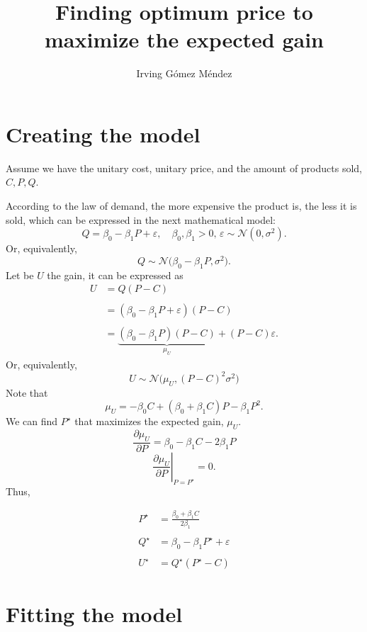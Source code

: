 \documentclass[11pt]{article}
\def\Normal{\mathcal{N}}
\begin{document}
\title{Finding optimum price to maximize the expected gain}
\author{Irving Gómez Méndez}
\date{}
\maketitle

\section{Creating the model}

Assume we have the unitary cost, unitary price, and the amount of products sold, $C,P,Q$.

According to the law of demand, the more expensive the product is, the less it is sold, which can be expressed in the next mathematical model:
\[Q=\beta_0-\beta_1 P+\varepsilon,\quad \beta_0,\beta_1>0,\,\varepsilon\sim\Normal(0,\sigma^2).\]
Or, equivalently,
\[Q\sim\Normal\Big(\beta_0-\beta_1 P, \sigma^2\Big).\]
Let be $U$ the gain, it can be expressed as
\begin{align*}
U &= Q(P-C) \\\\
&= (\beta_0-\beta_1 P+\varepsilon)(P-C) \\\\
& = \underbrace{(\beta_0-\beta_1 P)(P-C)}_{\mu_U}+(P-C)\varepsilon.
\end{align*}
Or, equivalently,
\[U\sim\Normal\Big(\mu_U,(P-C)^2\sigma^2\Big)\]
Note that
\[\mu_U=-\beta_0C+(\beta_0+\beta_1C)P-\beta_1P^2.\]
We can find $P^\star$ that maximizes the expected gain, $\mu_U$.
\[\frac{\partial \mu_U}{\partial P}=\beta_0-\beta_1C-2\beta_1 P\]
\[\left.\frac{\partial \mu_U}{\partial P}\right|_{P=P^\star}=0.\]
Thus,
\begin{IrvingBox}
\vspace{-0.5cm}
\begin{align*}
P^\star &= \frac{\beta_0+\beta_1C}{2\beta_1} \\\\
Q^\star &= \beta_0-\beta_1P^\star+\varepsilon \\\\
U^\star &= Q^\star(P^\star-C)
\end{align*}
\end{IrvingBox}

\section{Fitting the model}
\end{document}
